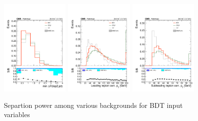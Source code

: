 \begin{figure}[htp]
\centering
\includegraphics[width=0.3\textwidth]{ch9_figs/kinMVA_input_mindr_lep2_jet.pdf}
\includegraphics[width=0.3\textwidth]{ch9_figs/kinMVA_input_LepGood0_conePt.pdf}
\includegraphics[width=0.3\textwidth]{ch9_figs/kinMVA_input_LepGood1_conePt.pdf}
\caption[Signal extraction BDT input variables]{Separtion power among various backgrounds for BDT input variables}
\label{fig:inputs2}
\end{figure}

